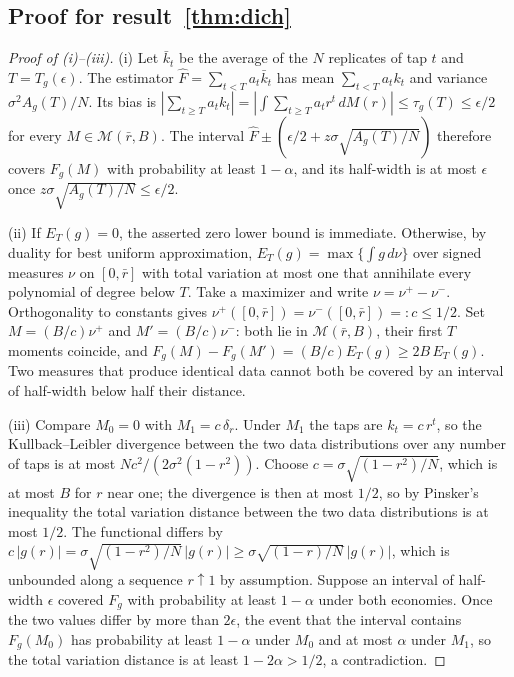 \documentclass[11pt]{article}
\theoremstyle{definition}
\theoremstyle{remark}
\begin{document}
\subsection{Proof for result~\ref{thm:dich}}\label{app:paper3proof1}
\begin{proof}[Proof of (i)--(iii)]
(i) Let $\bar k_t$ be the average of the $N$ replicates of tap $t$ and $T=T_g(\epsilon)$. The estimator $\hat F=\sum_{t<T}a_t\bar k_t$ has mean $\sum_{t<T}a_tk_t$ and variance $\sigma^2A_g(T)/N$. Its bias is $|\sum_{t\ge T}a_tk_t|=|\int\sum_{t\ge T}a_tr^t\,dM(r)|\le\tau_g(T)\le\epsilon/2$ for every $M\in\mathcal M(\bar r,B)$. The interval $\hat F\pm(\epsilon/2+z\sigma\sqrt{A_g(T)/N})$ therefore covers $F_g(M)$ with probability at least $1-\alpha$, and its half-width is at most $\epsilon$ once $z\sigma\sqrt{A_g(T)/N}\le\epsilon/2$.

(ii) If $E_T(g)=0$, the asserted zero lower bound is immediate. Otherwise, by duality for best uniform approximation, $E_T(g)=\max\{\int g\,d\nu\}$ over signed measures $\nu$ on $[0,\bar r]$ with total variation at most one that annihilate every polynomial of degree below $T$. Take a maximizer and write $\nu=\nu^+-\nu^-$. Orthogonality to constants gives $\nu^+([0,\bar r])=\nu^-([0,\bar r])=:c\le1/2$. Set $M=(B/c)\nu^+$ and $M'=(B/c)\nu^-$: both lie in $\mathcal M(\bar r,B)$, their first $T$ moments coincide, and $F_g(M)-F_g(M')=(B/c)E_T(g)\ge2B\,E_T(g)$. Two measures that produce identical data cannot both be covered by an interval of half-width below half their distance.

(iii) Compare $M_0=0$ with $M_1=c\,\delta_r$. Under $M_1$ the taps are $k_t=c\,r^t$, so the Kullback--Leibler divergence between the two data distributions over any number of taps is at most $Nc^2/(2\sigma^2(1-r^2))$. Choose $c=\sigma\sqrt{(1-r^2)/N}$, which is at most $B$ for $r$ near one; the divergence is then at most $1/2$, so by Pinsker's inequality the total variation distance between the two data distributions is at most $1/2$. The functional differs by $c\,|g(r)|=\sigma\sqrt{(1-r^2)/N}\,|g(r)|\ge\sigma\sqrt{(1-r)/N}\,|g(r)|$, which is unbounded along a sequence $r\uparrow1$ by assumption. Suppose an interval of half-width $\epsilon$ covered $F_g$ with probability at least $1-\alpha$ under both economies. Once the two values differ by more than $2\epsilon$, the event that the interval contains $F_g(M_0)$ has probability at least $1-\alpha$ under $M_0$ and at most $\alpha$ under $M_1$, so the total variation distance is at least $1-2\alpha>1/2$, a contradiction.
\end{proof}
\end{document}
